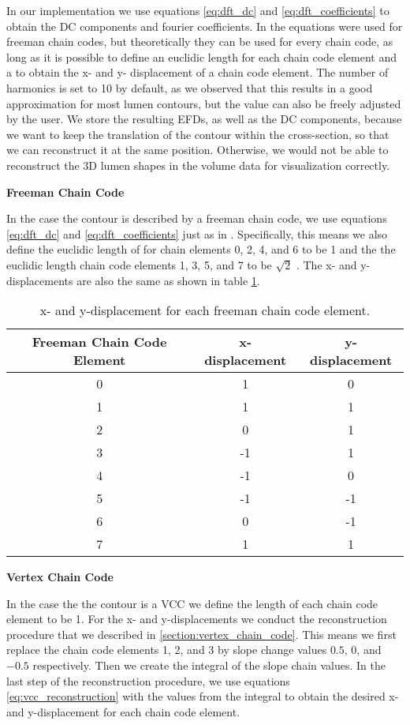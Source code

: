 \documentclass[thesis.tex]{subfiles}
\begin{document}
In our implementation we use equations \ref{eq:dft_dc} and \ref{eq:dft_coefficients} to obtain the DC components and fourier coefficients. In \cite{giardinia} the equations were used for freeman chain codes, but theoretically they can be used for every chain code, as long as it is possible to define an euclidic length for each chain code element and a to obtain the x- and y- displacement of a chain code element. The number of harmonics is set to 10 by default, as we observed that this results in a good approximation for most lumen contours, but the value can also be freely adjusted by the user. We store the resulting EFDs, as well as the DC components, because we want to keep the translation of the contour within the cross-section, so that we can reconstruct it at the same position. Otherwise, we would not be able to reconstruct the 3D lumen shapes in the volume data for visualization correctly.

\textbf{Freeman Chain Code}

In the case the contour is described by a freeman chain code, we use equations \ref{eq:dft_dc} and \ref{eq:dft_coefficients} just as in \cite{giardinia}. Specifically, this means we also define the euclidic length of for chain elements 0, 2, 4, and 6 to be 1 and the the euclidic length chain code elements 1, 3, 5, and 7 to be $\sqrt{2}$ . The x- and y-displacements are also the same as shown in table \ref{table:freeman_displacements}.

\begin{table}[h!]
\centering
 \begin{tabular}{||c c c||} 
 \hline
 Freeman Chain Code Element &  x-displacement & y-displacement\\ [0.5ex] 
 \hline\hline
 0 & 1 & 0 \\ 
 \hline
 1 & 1 & 1\\
 \hline
 2 & 0 & 1\\
 \hline
 3 & -1 & 1\\
 \hline
 4 & -1 & 0\\
 \hline
 5 & -1 & -1\\
 \hline
 6 & 0 & -1\\
 \hline
 7 & 1 & 1\\
 \hline
 \hline
\end{tabular}
\caption{x- and y-displacement for each freeman chain code element.}
\label{table:freeman_displacements}
\end{table}

\textbf{ Vertex Chain Code}

In the case the the contour is a VCC we define the length of each chain code element to be 1. For the x- and y-displacements we conduct the reconstruction procedure that we described in \ref{section:vertex_chain_code}. This means we first replace the chain code elements 1, 2, and 3 by slope change values $0.5$, $0$, and $-0.5$ respectively. Then we create the integral of the slope chain values. In the last step of the reconstruction procedure, we use equations \ref{eq:vcc_reconstruction} with the values from the integral to obtain the desired x- and y-displacement for each chain code element.
\end{document}

